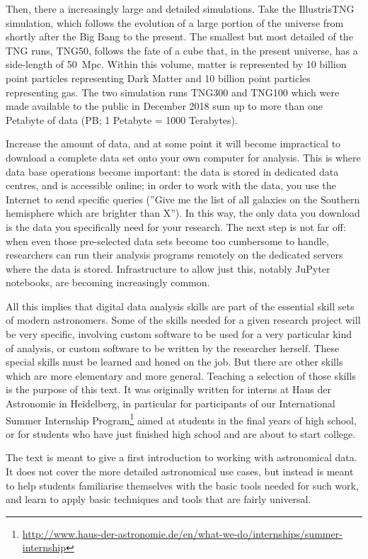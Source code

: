 \documentclass[twocolumn,apj]{openjournal}
\begin{document}
Then, there a increasingly large and detailed simulations. Take the IllustrisTNG simulation, which follows the evolution of a large portion of the universe from shortly after the Big Bang to the present. The smallest but most detailed of the TNG runs, TNG50, follows the fate of a cube that, in the present universe, has a side-length of 50~Mpc. Within this volume, matter is represented by 10 billion point particles representing Dark Matter and 10 billion point particles representing gas. The two simulation runs TNG300 and TNG100 which were made available to the public in December 2018 sum up to more than one Petabyte of data (PB; 1 Petabyte = 1000 Terabytes).

Increase the amount of data, and at some point it will become impractical to download a complete data set onto your own computer for analysis. This is where data base operations become important: the data is stored in dedicated data centres, and is accessible online; in order to work with the data, you use the Internet to send specific queries (''Give me the list of all galaxies on the Southern hemisphere which are brighter than X''). In this way, the only data you download is the data you specifically need for your research. The next step is not far off: when even those pre-selected data sets become too cumbersome to handle, researchers can run their analysis programs remotely on the dedicated servers where the data is stored. Infrastructure to allow just this, notably JuPyter notebooks, are becoming increasingly common.

All this implies that digital data analysis skills are part of the essential skill sets of modern astronomers. Some of the skills needed for a given research project will be very specific, involving custom software to be used for a very particular kind of analysis, or custom software to be written by the researcher herself. These special skills must be learned and honed on the job. But there are other skills which are more elementary and more general. Teaching a selection of those skills is the purpose of this text. It was originally written for interns at Haus der Astronomie in Heidelberg, in particular for participants of our International Summer Internship Program\footnote{\url{http://www.haus-der-astronomie.de/en/what-we-do/internships/summer-internship}} aimed at students in the final years of high school, or for students who have just finished high school and are about to start college. 

The text is meant to give a first introduction to working with astronomical data. It does not cover the more detailed astronomical use cases, but instead is meant to help students familiarise themselves with the basic tools needed for such work, and learn to apply basic techniques and tools that are fairly universal.
\end{document}
